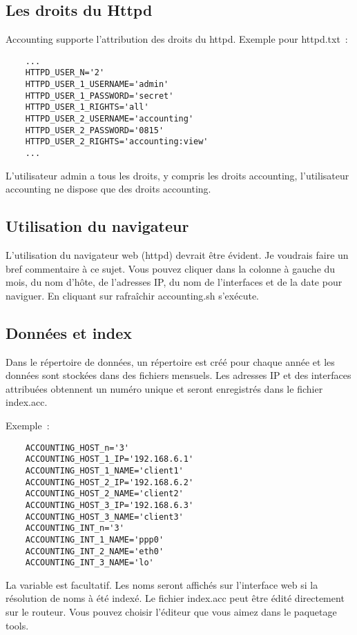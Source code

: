\subsection{Les droits du Httpd}
Accounting supporte l'attribution des droits du httpd.
Exemple pour httpd.txt~:
\begin{example}
\begin{verbatim}
    ...
    HTTPD_USER_N='2'
    HTTPD_USER_1_USERNAME='admin'
    HTTPD_USER_1_PASSWORD='secret'
    HTTPD_USER_1_RIGHTS='all'
    HTTPD_USER_2_USERNAME='accounting'
    HTTPD_USER_2_PASSWORD='0815'
    HTTPD_USER_2_RIGHTS='accounting:view'
    ...
\end{verbatim}
\end{example}
L'utilisateur admin a tous les droits, y compris les droits accounting,
l'utilisateur accounting ne dispose que des droits accounting.

\subsection{Utilisation du navigateur}
L'utilisation du navigateur web (httpd) devrait être évident. Je voudrais faire
un bref commentaire à ce sujet. Vous pouvez cliquer dans la colonne à gauche
du mois, du nom d'hôte, de l'adresses IP, du nom de l'interfaces et de la date 
pour naviguer. En cliquant sur rafraîchir accounting.sh s'exécute.

\subsection{Données et index}
Dans le répertoire de données, un répertoire est créé pour chaque année et
les données sont stockées dans des fichiers mensuels. Les adresses IP et
des interfaces attribuées obtennent un numéro unique et seront enregistrés
dans le fichier index.acc.

Exemple~:
\begin{example}
\begin{verbatim}
    ACCOUNTING_HOST_n='3'
    ACCOUNTING_HOST_1_IP='192.168.6.1'
    ACCOUNTING_HOST_1_NAME='client1'
    ACCOUNTING_HOST_2_IP='192.168.6.2'
    ACCOUNTING_HOST_2_NAME='client2'
    ACCOUNTING_HOST_3_IP='192.168.6.3'
    ACCOUNTING_HOST_3_NAME='client3'
    ACCOUNTING_INT_n='3'
    ACCOUNTING_INT_1_NAME='ppp0'
    ACCOUNTING_INT_2_NAME='eth0'
    ACCOUNTING_INT_3_NAME='lo'
\end{verbatim}
\end{example}
La variable  est facultatif. Les noms seront
affichés sur l'interface web si la résolution de noms à été indexé. Le fichier
index.acc peut être édité directement sur le routeur. Vous pouvez choisir
l'éditeur que vous aimez dans le paquetage tools.

